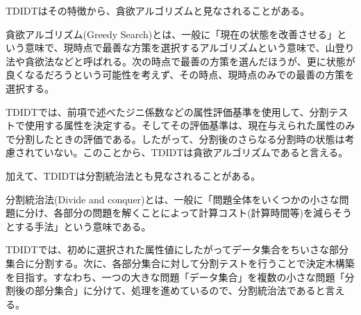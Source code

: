 \documentclass[dvipdfmx]{jsarticle}
\begin{document}
TDIDTはその特徴から、貪欲アルゴリズムと見なされることがある。\par
貪欲アルゴリズム(Greedy Search)とは、一般に「現在の状態を改善させる」という意味で、現時点で最善な方策を選択するアルゴリズムという意味で、山登り法や貪欲法などと呼ばれる。次の時点で最善の方策を選んだほうが、更に状態が良くなるだろうという可能性を考えず、その時点、現時点のみでの最善の方策を選択する。\par
TDIDTでは、前項で述べたジニ係数などの属性評価基準を使用して、分割テストで使用する属性を決定する。そしてその評価基準は、現在与えられた属性のみで分割したときの評価である。したがって、分割後のさらなる分割時の状態は考慮されていない。このことから、TDIDTは貪欲アルゴリズムであると言える。\par
加えて、TDIDTは分割統治法とも見なされることがある。\par
分割統治法(Divide and conquer)とは、一般に「問題全体をいくつかの小さな問題に分け、各部分の問題を解くことによって計算コスト(計算時間等)を減らそうとする手法」という意味である。\par
TDIDTでは、初めに選択された属性値にしたがってデータ集合をちいさな部分集合に分割する。次に、各部分集合に対して分割テストを行うことで決定木構築を目指す。すなわち、一つの大きな問題「データ集合」を複数の小さな問題「分割後の部分集合」に分けて、処理を進めているので、分割統治法であると言える。
\end{document}
